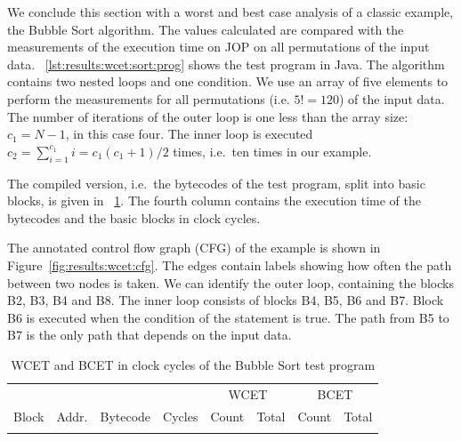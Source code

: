 We conclude this section with a worst and best case analysis of a
classic example, the Bubble Sort algorithm. The values calculated
are compared with the measurements of the execution time on JOP on
all permutations of the input data.
\figurename~\ref{lst:results:wcet:sort:prog} shows the test program
in Java. The algorithm contains two nested loops and one condition.
We use an array of five elements to perform the measurements for all
permutations (i.e. $5!=120$) of the input data. The number of
iterations of the outer loop is one less than the array size:
$c_1=N-1$, in this case four. The inner loop is executed $c_2 =
\sum_{i=1}^{c_1}i = c_1(c_1+1)/2$ times, i.e.\ ten times in our
example.


The compiled version, i.e.\ the bytecodes of the test program, split
into basic blocks, is given in
\tablename~\ref{tab:results:bubble:wcet}. The fourth column contains
the execution time of the bytecodes and the basic blocks in clock
cycles.

The annotated control flow graph (CFG) of the example is shown in
Figure~\ref{fig:results:wcet:cfg}. The edges contain labels showing
how often the path between two nodes is taken. We can identify the
outer loop, containing the blocks B2, B3, B4 and B8. The inner loop
consists of blocks B4, B5, B6 and B7. Block B6 is executed when the
condition of the  statement is true. The path from B5 to B7
is the only path that depends on the input data.

\pagebreak[3]
\begin{longtable}{lllrrrrr}
    \toprule
    & & & & \multicolumn{2}{c}{WCET} & \multicolumn{2}{c}{BCET} \\
    Block & Addr. & Bytecode & Cycles & Count & Total & Count & Total \\
    \midrule
    \endhead
    \caption{WCET and BCET in clock cycles of the Bubble Sort test
    program\label{tab:results:bubble:wcet}}
    \endfoot
    \caption[]{WCET and BCET in clock cycles of the Bubble Sort test
    program}
    \endlastfoot
    
    \bottomrule
\end{longtable}


